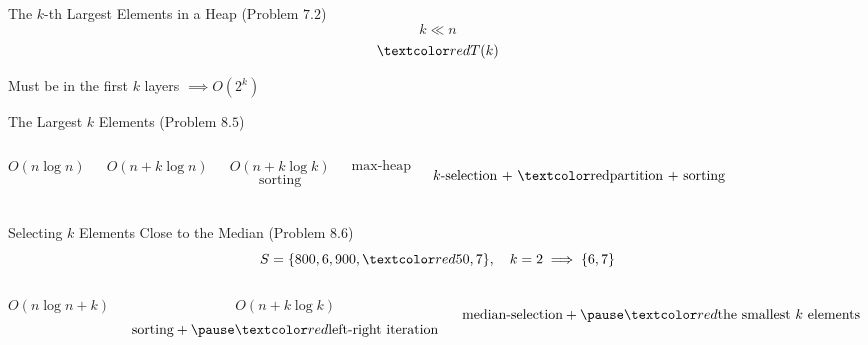 
\begin{frame}{}
  \centerline{}
\end{frame}

\begin{frame}{}
  \begin{exampleblock}{The $k$-th Largest Elements in a Heap (Problem $7.2$)}
    \[
      k \ll n
    \]
    \vspace{-0.60cm}
    \vspace{-0.50cm}
    \[
      \red{T(k)}
    \]
  \end{exampleblock}

  \pause
  \vspace{0.30cm}
  \centerline{Must be in the first $k$ layers \pause $\implies O(2^k)$}
\end{frame}

\begin{frame}{}
  \begin{exampleblock}{The Largest $k$ Elements (Problem $8.5$)}
    \begin{columns}
	\[
	  O(n \log n)
	\]

	\[
	  O(n + k \log n)
	\]

	\[
	  O(n + k \log k)
	\]
	\pause
        \[
	  \text{sorting}
	\]

	\pause
	\[
	  \text{max-heap}
	\]

	\pause
	\[
	  \text{$k$-selection + \red{partition} + sorting}
	\]
    \end{columns}
  \end{exampleblock}
\end{frame}

\begin{frame}{}
  \begin{exampleblock}{Selecting $k$ Elements Close to the Median (Problem $8.6$)}
    \[
      S = \set{800, 6, 900, \red{50}, 7}, \quad k = 2 \implies \set{6,7}
    \]

    \begin{columns}
      \pause
        \[
	  O(n \log n + k)
	\]

	\[
	  O(n + k \log k)
	\]
        \pause
        \[
	  \text{sorting} + \pause \red{\text{left-right iteration}}
	\]

	\pause
	\vspace{-0.80cm}
	\[
	  \text{median-selection} + \pause \red{\text{the smallest $k$ elements}}
	\]
    \end{columns}
  \end{exampleblock}
\end{frame}

